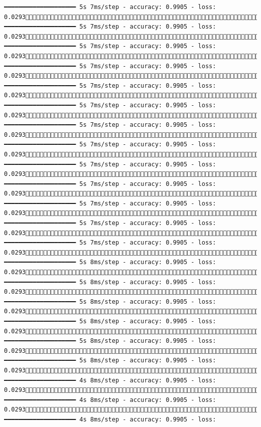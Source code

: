 \documentclass[
  letterpaper,
  DIV=11,
  numbers=noendperiod]{scrreprt}
\begin{document}
\begin{verbatim}
━━━━━━━━━━━━━━━━━━━━ 5s 7ms/step - accuracy: 0.9905 - loss: 0.02931096/1875 ━━━━━━━━━━━━━━━━━━━━ 5s 7ms/step - accuracy: 0.9905 - loss: 0.02931103/1875 ━━━━━━━━━━━━━━━━━━━━ 5s 7ms/step - accuracy: 0.9905 - loss: 0.02931111/1875 ━━━━━━━━━━━━━━━━━━━━ 5s 7ms/step - accuracy: 0.9905 - loss: 0.02931119/1875 ━━━━━━━━━━━━━━━━━━━━ 5s 7ms/step - accuracy: 0.9905 - loss: 0.02931126/1875 ━━━━━━━━━━━━━━━━━━━━ 5s 7ms/step - accuracy: 0.9905 - loss: 0.02931133/1875 ━━━━━━━━━━━━━━━━━━━━ 5s 7ms/step - accuracy: 0.9905 - loss: 0.02931140/1875 ━━━━━━━━━━━━━━━━━━━━ 5s 7ms/step - accuracy: 0.9905 - loss: 0.02931148/1875 ━━━━━━━━━━━━━━━━━━━━ 5s 7ms/step - accuracy: 0.9905 - loss: 0.02931155/1875 ━━━━━━━━━━━━━━━━━━━━ 5s 7ms/step - accuracy: 0.9905 - loss: 0.02931162/1875 ━━━━━━━━━━━━━━━━━━━━ 5s 7ms/step - accuracy: 0.9905 - loss: 0.02931168/1875 ━━━━━━━━━━━━━━━━━━━━ 5s 7ms/step - accuracy: 0.9905 - loss: 0.02931175/1875 ━━━━━━━━━━━━━━━━━━━━ 5s 7ms/step - accuracy: 0.9905 - loss: 0.02931181/1875 ━━━━━━━━━━━━━━━━━━━━ 5s 8ms/step - accuracy: 0.9905 - loss: 0.02931187/1875 ━━━━━━━━━━━━━━━━━━━━ 5s 8ms/step - accuracy: 0.9905 - loss: 0.02931192/1875 ━━━━━━━━━━━━━━━━━━━━ 5s 8ms/step - accuracy: 0.9905 - loss: 0.02931196/1875 ━━━━━━━━━━━━━━━━━━━━ 5s 8ms/step - accuracy: 0.9905 - loss: 0.02931201/1875 ━━━━━━━━━━━━━━━━━━━━ 5s 8ms/step - accuracy: 0.9905 - loss: 0.02931208/1875 ━━━━━━━━━━━━━━━━━━━━ 5s 8ms/step - accuracy: 0.9905 - loss: 0.02931215/1875 ━━━━━━━━━━━━━━━━━━━━ 4s 8ms/step - accuracy: 0.9905 - loss: 0.02931222/1875 ━━━━━━━━━━━━━━━━━━━━ 4s 8ms/step - accuracy: 0.9905 - loss: 0.02931230/1875 ━━━━━━━━━━━━━━━━━━━━ 4s 8ms/step - accuracy: 0.9905 - loss: 
\end{verbatim}
\end{document}

